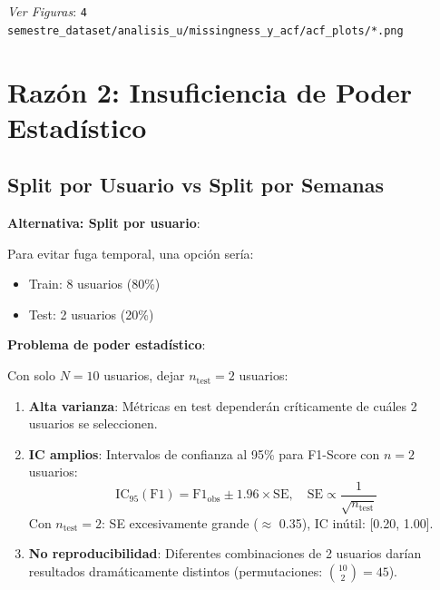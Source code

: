 \documentclass[12pt,letterpaper,twoside]{report}
\begin{document}
\textit{Ver Figuras}: \texttt{4 semestre\_dataset/analisis\_u/missingness\_y\_acf/acf\_plots/*.png}

\section{Razón 2: Insuficiencia de Poder Estadístico}

\subsection{Split por Usuario vs Split por Semanas}

\begin{estadisticobox}
\textbf{Alternativa: Split por usuario}:

Para evitar fuga temporal, una opción sería:
\begin{itemize}[noitemsep]
    \item Train: 8 usuarios (80\%)
    \item Test: 2 usuarios (20\%)
\end{itemize}

\textbf{Problema de poder estadístico}:

Con solo $N=10$ usuarios, dejar $n_{\text{test}}=2$ usuarios:

\begin{enumerate}[noitemsep]
    \item \textbf{Alta varianza}: Métricas en test dependerán críticamente de cuáles 2 usuarios se seleccionen.
    
    \item \textbf{IC amplios}: Intervalos de confianza al 95\% para F1-Score con $n=2$ usuarios:
    \begin{equation}
    \text{IC}_{95}(\text{F1}) = \text{F1}_{\text{obs}} \pm 1.96 \times \text{SE}, \quad \text{SE} \propto \frac{1}{\sqrt{n_{\text{test}}}}
    \end{equation}
    Con $n_{\text{test}}=2$: SE excesivamente grande ($\approx$ 0.35), IC inútil: [0.20, 1.00].
    
    \item \textbf{No reproducibilidad}: Diferentes combinaciones de 2 usuarios darían resultados dramáticamente distintos (permutaciones: $\binom{10}{2}=45$).
\end{enumerate}
\end{estadisticobox}
\end{document}
